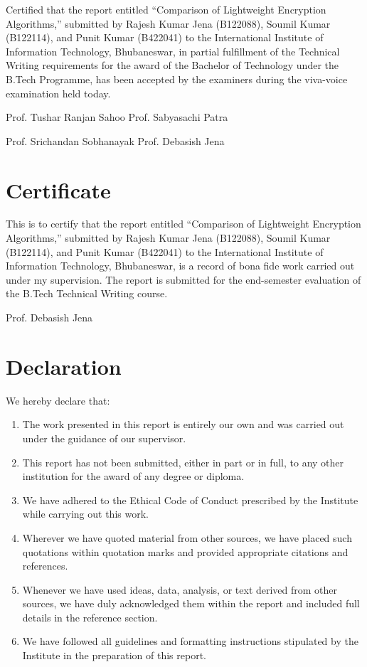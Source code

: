 \documentclass[12pt]{report}
\begin{document}
\noindent Certified that the report entitled ``Comparison of Lightweight Encryption Algorithms,''
submitted by Rajesh Kumar Jena (B122088), Soumil Kumar (B122114), and Punit Kumar (B422041)
to the International Institute of Information Technology, Bhubaneswar, in partial fulfillment
of the Technical Writing requirements for the award of the Bachelor of Technology under the
B.Tech Programme, has been accepted by the examiners during the viva-voice examination held today.

\vfill

\noindent Prof. Tushar Ranjan Sahoo \hfill Prof. Sabyasachi Patra

\vspace{1cm}

\noindent Prof. Srichandan Sobhanayak \hfill Prof. Debasish Jena

\newpage
\chapter*{Certificate}

This is to certify that the report entitled ``Comparison of Lightweight Encryption Algorithms,''
submitted by Rajesh Kumar Jena (B122088), Soumil Kumar (B122114), and Punit Kumar (B422041)
to the International Institute of Information Technology, Bhubaneswar, is a record of bona fide
work carried out under my supervision. The report is submitted for the end-semester evaluation
of the B.Tech Technical Writing course.

\vfill
\noindent Prof. Debasish Jena

\newpage
\chapter*{Declaration}

We hereby declare that:

\begin{enumerate}
    \item The work presented in this report is entirely our own and was carried out under the guidance of our supervisor.
    \item This report has not been submitted, either in part or in full, to any other institution for the award of any degree or diploma.
    \item We have adhered to the Ethical Code of Conduct prescribed by the Institute while carrying out this work.
    \item Wherever we have quoted material from other sources, we have placed such quotations within quotation marks and provided appropriate citations and references.
    \item Whenever we have used ideas, data, analysis, or text derived from other sources, we have duly acknowledged them within the report and included full details in the reference section.
    \item We have followed all guidelines and formatting instructions stipulated by the Institute in the preparation of this report.
\end{enumerate}
\end{document}
